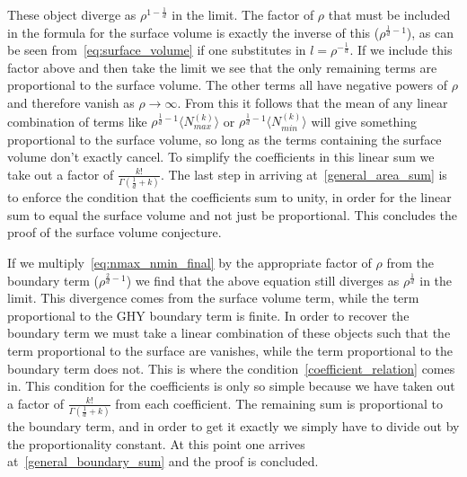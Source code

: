 \documentclass[12pt]{article}
\begin{document}
These object diverge as $\rho^{1-\frac{1}{d}}$ in the limit. The factor of $\rho$ that must be included in the formula for the surface volume is exactly the inverse of this ($\rho^{\frac{1}{d}-1}$), as can be seen from~\eqref{eq:surface_volume} if one substitutes in $l=\rho^{-\frac{1}{d}}$. If we include this factor above and then take the limit we see that the only remaining terms are proportional to the surface volume. The other terms all have negative powers of $\rho$ and therefore vanish as $\rho\rightarrow\infty$. From this it follows that the mean of any linear combination of terms like $\rho^{\frac{1}{d}-1}\langle N_{max}^{(k)}\rangle$ or $\rho^{\frac{1}{d}-1}\langle N_{min}^{(k)}\rangle$ will give something proportional to the surface volume, so long as the terms containing the surface volume don't exactly cancel. To simplify the coefficients in this linear sum we take out a factor of $\frac{k!}{\Gamma\left(\frac{1}{d}+k\right)}$. The last step in arriving at~\eqref{general_area_sum} is to enforce the condition that the coefficients sum to unity, in order for the linear sum to equal the surface volume and not just be proportional. This concludes the proof of the surface volume conjecture. 

If we multiply~\eqref{eq:nmax_nmin_final} by the appropriate factor of $\rho$ from the boundary term ($\rho^{\frac{2}{d}-1}$) we find that the above equation still diverges as $\rho^{\frac{1}{d}}$ in the limit. This divergence comes from the surface volume term, while the term proportional to the GHY boundary term is finite. In order to recover the boundary term we must take a linear combination of these objects such that the term proportional to the surface are vanishes, while the term proportional to the boundary term does not. This is where the condition~\eqref{coefficient_relation} comes in. This condition for the coefficients is only so simple because we have taken out a factor of $\frac{k!}{\Gamma\left(\frac{1}{d}+k\right)}$ from each coefficient. The remaining sum is proportional to the boundary term, and in order to get it exactly we simply have to divide out by the proportionality constant. At this point one arrives at~\eqref{general_boundary_sum} and the proof is concluded.
\end{document}
